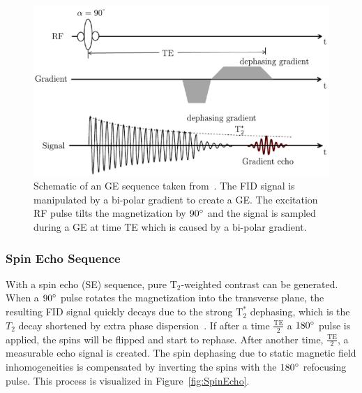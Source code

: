 \begin{figure}[h] %
	\centering
	\includegraphics[width=\linewidth]{./Images/GradientEcho.pdf} 
	\caption{Schematic of an GE sequence taken from~\cite{PulseSequences}. The FID signal is manipulated by a bi-polar gradient to create a GE. The excitation RF pulse tilts the magnetization by $90 \degree$ and the signal is sampled during a GE at time TE which is caused by a bi-polar gradient.}
	\label{fig:GradientEcho}
\end{figure}

\subsubsection{Spin Echo Sequence}
With a spin echo (SE) sequence, pure $\text{T}_2$-weighted contrast can be generated. When a $90\degree$ pulse rotates the magnetization into the transverse plane, the resulting FID signal quickly decays due to the strong $\text{T}^*_2$ dephasing, which is the $T_2$ decay shortened by extra phase dispersion~\cite{Serai2021}. If after a time $\frac{\text{TE}}{2}$ a $180\degree$ pulse is applied, the spins will be flipped and start to rephase. After another time, $\frac{\text{TE}}{2}$, a measurable echo signal is created. The spin dephasing due to static magnetic field inhomogeneities is compensated by inverting the spins with the $180\degree$ refocusing pulse. This process is visualized in Figure~\ref{fig:SpinEcho}.

